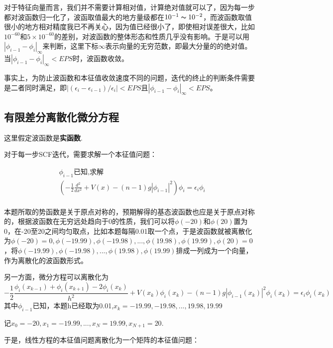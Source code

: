 \documentclass[10pt, a4paper]{article}
\begin{document}
    对于特征向量而言，我们并不需要计算相对值，计算绝对值就可以了，因为每一步都对波函数归一化了，波函取值最大的地方量级都在$10^{-1}\thicksim10^{-2}$，而波函数取值很小的地方相对精度我已不再关心，因为值已经很小了，即使相对误差很大，比如$10^{-60}$和$5\times10^{-60}$的差别，对波函数的整体形态和性质几乎没有影响。于是可以用$|\phi_{i-1}-\phi_i|_\infty$来判断，这里下标$\infty$表示向量的无穷范数，即最大分量的的绝对值。当$|\phi_{i-1}-\phi_i|_\infty<EPS$时，波函数收敛。

    事实上，为防止波函数和本征值收敛速度不同的问题，迭代的终止的判断条件需要是二者同时满足，即$|(\epsilon_i-\epsilon_{i-1})/\epsilon_i|<EPS$且$|\phi_{i-1}-\phi_i|_\infty<EPS$。

    \subsection{有限差分离散化微分方程}
    这里假定波函数是\textbf{实函数}.

    对于每一步SCF迭代，需要求解一个本征值问题：

    \begin{align*}
      &\phi_{i-1}\text{已知,求解}\\
      &(-\frac{1}{2}\frac{d^2}{dx^2}+V(x)-{(n-1)}g|\phi_{i-1}|^2)\phi_i=\epsilon_i \phi_i\\
    \end{align*}
    
    本题所取的势函数是关于原点对称的，预期解得的基态波函数也应是关于原点对称的，根据波函数在无穷远处趋向于0的性质，我们可以将$\phi(-20)$和$\phi(20)$置为0，在-20至20之间均匀取点，比如本题每隔0.01取一个点，于是波函数就被离散化为$\phi(-20)=0,\phi(-19.99),\phi(-19.98),...,\phi(19.98),\phi(19.99),\phi(20)=0$，将$\phi(-19.99),\phi(-19.98),...,\phi(19.98),\phi(19.99)$排成一列成为一个向量，作为离散化的波函数形式。

    另一方面，微分方程可以离散化为
    \[-\frac{1}{2}\frac{\phi_i(x_{k-1})+\phi_i(x_{k+1})-2\phi_i(x_k)}{h^2}+V(x_k)\phi_i(x_k)-{(n-1)}g|\phi_{i-1}(x_k)|^2\phi_i(x_k)=\epsilon_i \phi_i(x_k)\]
    其中$\phi_{i-1}$已知，本题h已经取为0.01,$x_k=-19.99,-19.98,...,19.98,19.99$

    记$x_0=-20,x_1=-19.99,...,x_N=19.99,x_{N+1}=20$.

    于是，线性方程的本征值问题离散化为一个矩阵的本征值问题：
\end{document}
